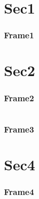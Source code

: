 \documentclass{beamer}
\begin{document}
\begin{frame}
\tableofcontents
\end{frame}

\section{Sec1}
\begin{frame}
\frametitle{Frame1}
\end{frame}

\section{Sec2}
\begin{frame}
\frametitle{Frame2}
\end{frame}



\section{} %

{
\makeatletter
\def\beamer@writeslidentry{\clearpage\beamer@notesactions}
\makeatother
\begin{frame}
\frametitle{Frame3}
\end{frame}
}

\section{Sec4}
\begin{frame}
\frametitle{Frame4}
\end{frame}
\end{document}
